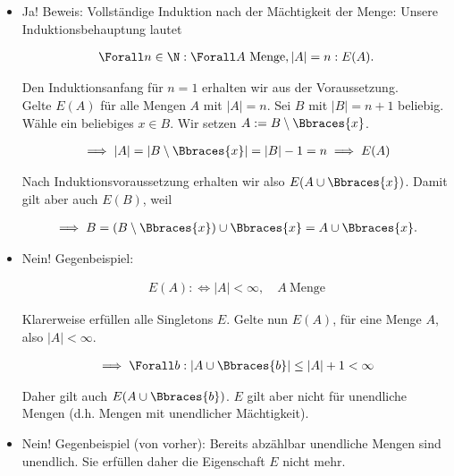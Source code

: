 \begin{solution}

  \phantom{}

  \begin{itemize}

    \item Ja!
    Beweis:
    Vollständige Induktion nach der Mächtigkeit der Menge:
    Unsere Induktionsbehauptung lautet

    \begin{align*}
      \Forall n \in \N:
      \Forall A ~\text{Menge}, |A| = n:
      E(A).
    \end{align*}

    Den Induktionsanfang für $n = 1$ erhalten wir aus der Voraussetzung. \\
    Gelte $E(A)$ für alle Mengen $A$ mit $|A| = n$.
    Sei $B$ mit $|B| = n + 1$ beliebig.
    Wähle ein beliebiges $x \in B$.
    Wir setzen $A := B \setminus \Bbraces{x}$.

    \begin{align*}
      \implies
      |A| = |B \setminus \Bbraces{x}| = |B| - 1 = n
      \implies
      E(A)
    \end{align*}

    Nach Induktionsvoraussetzung erhalten wir also $E(A \cup \Bbraces{x})$.
    Damit gilt aber auch $E(B)$, weil

    \begin{align*}
      \implies
      B = (B \setminus \Bbraces{x}) \cup \Bbraces{x}
      =
      A \cup \Bbraces{x}.
    \end{align*}

    \item Nein!
    Gegenbeispiel:

    \begin{align*}
      E(A) :\iff |A| < \infty,
      \quad
      A ~\text{Menge}
    \end{align*}

    Klarerweise erfüllen alle Singletons $E$.
    Gelte nun $E(A)$, für eine Menge $A$, also $|A| < \infty$.

    \begin{align*}
      \implies
      \Forall b:
      |A \cup \Bbraces{b}| \leq |A| + 1 < \infty
    \end{align*}

    Daher gilt auch $E(A \cup \Bbraces{b})$.
    $E$ gilt aber nicht für unendliche Mengen (d.h. Mengen mit unendlicher Mächtigkeit).

    \item Nein!
    Gegenbeispiel (von vorher):
    Bereits abzählbar unendliche Mengen sind unendlich.
    Sie erfüllen daher die Eigenschaft $E$ nicht mehr.

  \end{itemize}

\end{solution}


